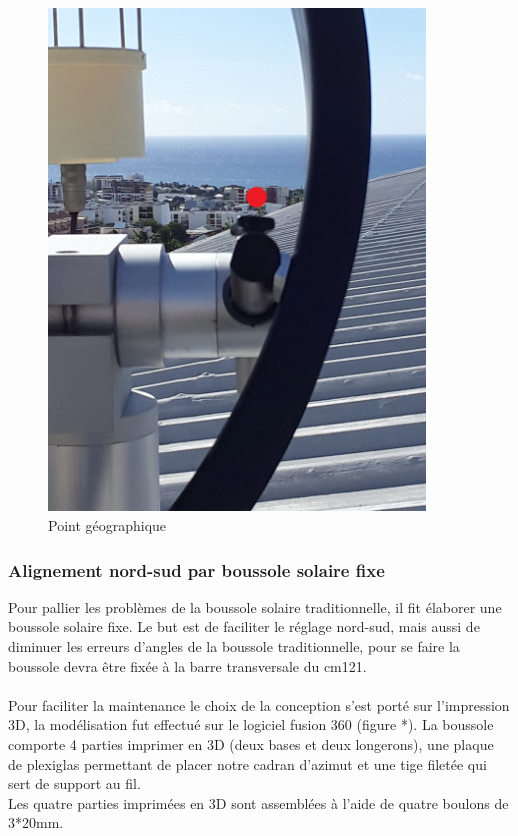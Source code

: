 \documentclass[12pt,a4paper]{article}
\begin{document}
\begin{flushleft}
\begin{figure}[H]
\centering
\includegraphics[width=10cm]{image/montage/6.jpg} 
\caption{Point géographique}
\end{figure}

\subsubsection{Alignement nord-sud par boussole solaire fixe}   

Pour pallier les problèmes de la boussole solaire traditionnelle, il fit élaborer une boussole solaire fixe. Le but est de faciliter le réglage nord-sud, mais aussi de diminuer les erreurs d'angles de la boussole traditionnelle, pour se faire la boussole devra être fixée à la barre transversale du cm121.\\
~\\
Pour faciliter la maintenance le choix de la conception s'est porté sur l'impression 3D, la modélisation fut effectué sur le logiciel fusion 360 (figure *). La boussole comporte 4 parties imprimer en 3D (deux bases et deux longerons), une plaque de plexiglas permettant de placer notre cadran d'azimut et une tige filetée qui sert de support au fil.\\



Les quatre parties imprimées en 3D sont assemblées à l'aide de quatre boulons de 3*20mm.\\


\end{flushleft}
\end{document}
